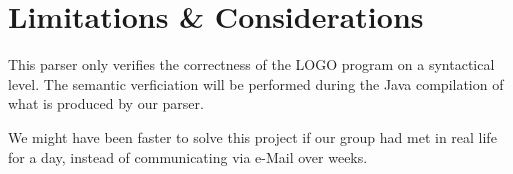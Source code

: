 \documentclass[
	a4paper,					%
	10pt,							%
	twoside,					%
	notitlepage,			%
	parskip=half,			%
]{scrreprt}					%
\begin{document}
\begingroup
\renewcommand{\cleardoublepage}{}
\renewcommand{\clearpage}{}

\chapter{Limitations \& Considerations}
\label{chap:limits}
This parser only verifies the correctness of the LOGO program on a syntactical level. The semantic verficiation will be performed during the Java compilation of what is produced by our parser.

We might have been faster to solve this project if our group had met in real life for a day, instead of communicating via e-Mail over weeks.
\endgroup
\end{document}
